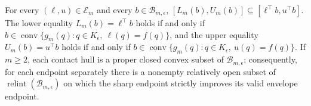 For every \((\ell,u)\in\mathcal E_m\) and every \(b\in\mathcal B_{m,\epsilon}\), \([L_m(b),U_m(b)]\subseteq[\ell^\top b,u^\top b]\). The lower equality \(L_m(b)=\ell^\top b\) holds if and only if \(b\in\operatorname{conv}\{g_m(q):q\in K_{\epsilon},\ \ell(q)=f(q)\}\), and the upper equality \(U_m(b)=u^\top b\) holds if and only if \(b\in\operatorname{conv}\{g_m(q):q\in K_{\epsilon},\ u(q)=f(q)\}\). If \(m\ge2\), each contact hull is a proper closed convex subset of \(\mathcal B_{m,\epsilon}\); consequently, for each endpoint separately there is a nonempty relatively open subset of \(\operatorname{relint}(\mathcal B_{m,\epsilon})\) on which the sharp endpoint strictly improves its valid envelope endpoint.